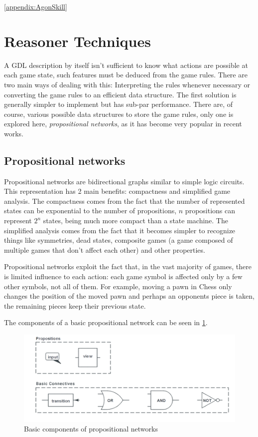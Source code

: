 \ref{appendix:AgonSkill}


\section{Reasoner Techniques}
A \gls{GDL} description by itself isn't sufficient to know what actions are possible at each game state, such features must be deduced from the game rules.
There are two main ways of dealing with this:
Interpreting the rules whenever necessary or converting the game rules to an efficient data structure. The first solution is generally simpler to implement but has sub-par performance. There are, of course, various possible data structures to store the game rules, only one is explored here, \textit{propositional networks}, as it has become very popular in recent works.


\subsection{Propositional networks}

Propositional networks are bidirectional graphs similar to simple logic circuits.
This representation has 2 main benefits: compactness and simplified game analysis.
The compactness comes from the fact that the number of represented states can be exponential to the number of propositions, $n$ propositions can represent $2^{n}$ states, being much more compact than a state machine.
The simplified analysis comes from the fact that it becomes simpler to recognize things like symmetries, dead states, composite games (a game composed of multiple games that don't affect each other) and other properties.

Propositional networks exploit the fact that, in the vast majority of games, there is limited influence to each action: each game symbol is affected only by a few other symbols, not all of them. For example, moving a pawn in Chess only changes the position of the moved pawn and perhaps an opponents piece is taken, the remaining pieces keep their previous state.

The components of a basic propositional network can be seen in \ref{fig:propnets components}.

\begin{figure}[h]
	\centering
    \includegraphics[scale=0.45]{images/propnets_components.png}
    \caption{Basic components of propositional networks}
    \label{fig:propnets components}
\end{figure}

